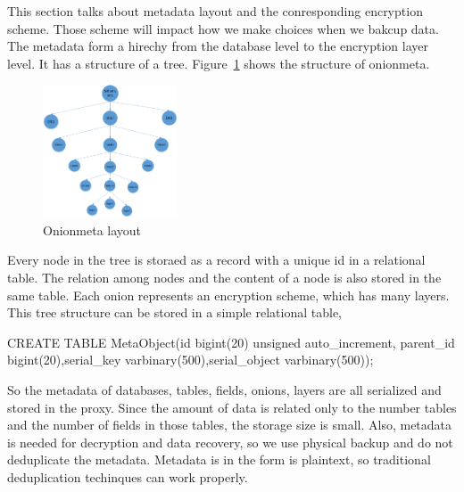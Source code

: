 This section talks about metadata layout and the conresponding encryption scheme. Those scheme will impact how we make choices when we bakcup data. The metadata form a hirechy from the database level to the encryption layer level. It has a structure of a tree. Figure~\ref{fig:stack2} shows the structure of onionmeta.


\begin{figure}[tb]
\centering
\includegraphics[width=4cm]{images/layers.png}
\caption{Onionmeta layout}
\label{fig:stack2}
\end{figure}

Every node in the tree is storaed as a record with a unique id in a relational table. The relation among nodes and the content of a node is also stored in the same table. Each onion represents an encryption scheme, which has many layers. This tree structure can be stored in a simple relational table, 

CREATE TABLE MetaObject(id bigint(20) unsigned auto\_increment, parent\_id bigint(20),serial\_key varbinary(500),serial\_object varbinary(500));  


So the metadata of databases, tables, fields, onions, layers are all serialized and stored in the proxy. Since the amount of data is related only to the number tables and the number of fields in those tables, the storage size is small. Also, metadata is needed for decryption and data recovery, so we use physical backup and do not deduplicate the metadata. Metadata is in the form is plaintext, so traditional deduplication techinques can work properly.

